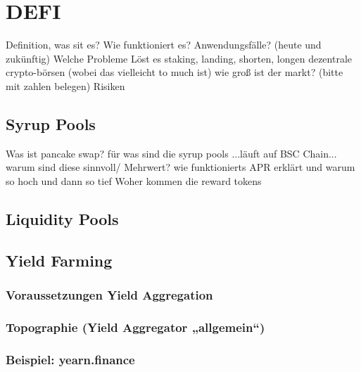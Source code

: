 \section{DEFI}
Definition, was sit es?
Wie funktioniert es?
Anwendungsfälle? (heute und zukünftig)
Welche Probleme Löst es
staking, landing, shorten, longen
dezentrale crypto-börsen (wobei das vielleicht to much ist)
wie groß ist der markt? (bitte mit zahlen belegen)
Risiken


\subsection{Syrup Pools}
Was ist pancake swap?
für was sind die syrup pools
...läuft auf BSC Chain...
warum sind diese sinnvoll/ Mehrwert?
wie funktionierts
APR erklärt und warum so hoch und dann so tief
Woher kommen die reward tokens


\subsection{Liquidity Pools}

\subsection{Yield Farming}
\subsubsection{Voraussetzungen Yield Aggregation}
\subsubsection{Topographie (Yield Aggregator „allgemein“)}
\subsubsection{Beispiel: yearn.finance}
